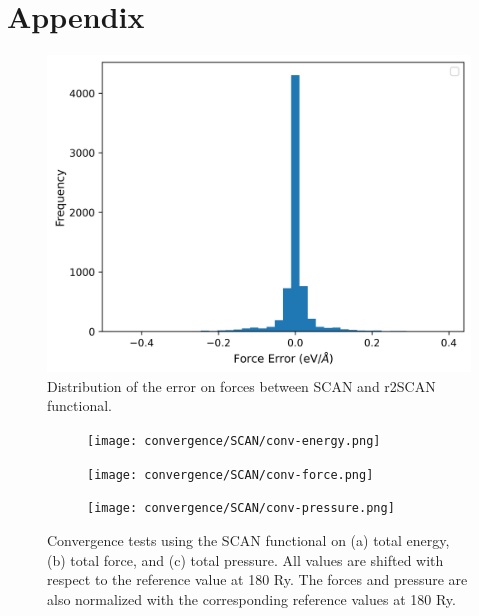 \chapter*{Appendix}

\renewcommand{\thefigure}{A.\arabic{figure}}
\setcounter{figure}{0}

\begin{figure}[h!]
    \centering

    \includegraphics[width=0.6\linewidth]{images/scan_vs_r2scan/r2scan_hist_force.png}
    \caption{Distribution of the error on forces between SCAN and r2SCAN
        functional.
    }
    \label{fig:scan_r2scan_F_dist}
\end{figure}

\begin{figure}[tbhp]
    \centering
    \begin{subfigure}{0.32\textwidth}
        \centering
        \texttt{[image: convergence/SCAN/conv-energy.png]}
        \caption{}
    \end{subfigure}
    \hfill
    \begin{subfigure}{0.32\textwidth}
        \centering
        \texttt{[image: convergence/SCAN/conv-force.png]}
        \caption{}
    \end{subfigure}
    \hfill
    \begin{subfigure}{0.32\textwidth}
        \centering

        \texttt{[image: convergence/SCAN/conv-pressure.png]}
        \caption{}
    \end{subfigure}
    \caption{Convergence tests using the SCAN functional on (a) total energy,
        (b) total force, and (c) total pressure. All values are shifted
        with respect to the reference value at 180 Ry. The forces and pressure
        are also normalized with the corresponding reference values at 180 Ry.}
    \label{fig:conv_scan}
\end{figure}



